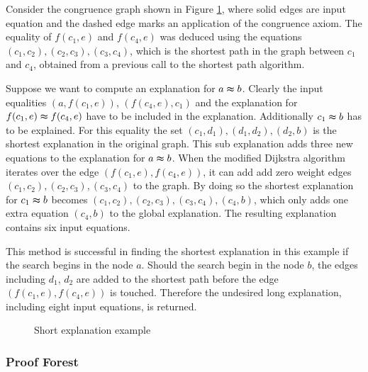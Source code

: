 \begin{example}
Consider the congruence graph shown in Figure \ref{fig:short_expl}, where solid edges are input equation and the dashed edge marks an application of the congruence axiom.
The equality of $f(c_1,e)$ and $f(c_4,e)$ was deduced using the equations $(c_1,c_2),(c_2,c_3),(c_3,c_4)$, which is the shortest path in the graph between $c_1$ and $c_4$, obtained from a previous call to the shortest path algorithm.

Suppose we want to compute an explanation for $a \thickapprox b$.
Clearly the input equalities $(a,f(c_1,e))$, $(f(c_4,e),c_1)$ and the explanation for $f(c_1,e) \thickapprox f(c_4,e)$ have to be included in the explanation.
Additionally $c_1 \thickapprox b$ has to be explained.
For this equality the set $(c_1,d_1),(d_1,d_2),(d_2,b)$ is the shortest explanation in the original graph.
This sub explanation adds three new equations to the explanation for $a \thickapprox b$.
When the modified Dijkstra algorithm iterates over the edge $(f(c_1,e),f(c_4,e))$, it can add add zero weight edges $(c_1,c_2),(c_2,c_3),(c_3,c_4)$ to the graph.
By doing so the shortest explanation for $c_1 \thickapprox b$ becomes $(c_1,c_2),(c_2,c_3),(c_3,c_4),(c_4,b)$, which only adds one extra equation $(c_4,b)$ to the global explanation.
The resulting explanation contains six input equations.

This method is successful in finding the shortest explanation in this example if the search begins in the node $a$.
Should the search begin in the node $b$, the edges including $d_1$, $d_2$ are added to the shortest path before the edge $(f(c_1,e),f(c_4,e))$ is touched.
Therefore the undesired long explanation, including eight input equations, is returned.

\begin{figure}[!h]

\caption{Short explanation example}
\label{fig:short_expl}
\end{figure}

\label{ex:short_expl}
\end{example}





\FloatBarrier

\subsubsection*{Proof Forest}

